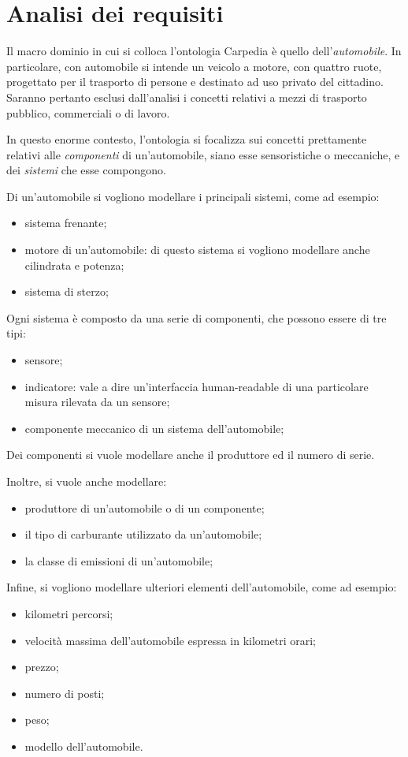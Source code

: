 \chapter{Analisi dei requisiti}
Il macro dominio in cui si colloca l'ontologia Carpedia è quello dell'\textit{automobile}. In particolare, con automobile si intende un veicolo a motore, con quattro ruote,
progettato per il trasporto di persone e destinato ad uso privato del cittadino.
Saranno pertanto esclusi dall'analisi i concetti relativi a mezzi di trasporto pubblico, commerciali o di lavoro.

In questo enorme contesto, l'ontologia si focalizza sui concetti prettamente relativi alle \textit{componenti} di un'automobile, siano esse sensoristiche o meccaniche, e dei \textit{sistemi} che
esse compongono.

Di un'automobile si vogliono modellare i principali sistemi, come ad esempio:

\begin{itemize}
    \item sistema frenante;
    \item motore di un'automobile: di questo sistema si vogliono modellare anche cilindrata e potenza;
    \item sistema di sterzo;
\end{itemize}

Ogni sistema è composto da una serie di componenti, che possono essere di tre tipi:
\begin{itemize}
    \item sensore;
    \item indicatore: vale a dire un'interfaccia human-readable di una particolare misura rilevata da un sensore;
    \item componente meccanico di un sistema dell'automobile;
\end{itemize}

Dei componenti si vuole modellare anche il produttore ed il numero di serie.

Inoltre, si vuole anche modellare:

\begin{itemize}
    \item produttore di un'automobile o di un componente;
    \item il tipo di carburante utilizzato da un'automobile;
    \item la classe di emissioni di un'automobile;
\end{itemize}

Infine, si vogliono modellare ulteriori elementi dell'automobile, come ad esempio:

\begin{itemize}
    \item kilometri percorsi;
    \item velocità massima dell'automobile espressa in kilometri orari;
    \item prezzo;
    \item numero di posti;
    \item peso;
    \item modello dell'automobile.
\end{itemize}